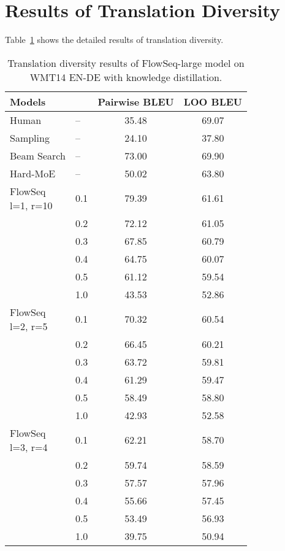 \documentclass[11pt,a4paper]{article}
\begin{document}
\section{Results of Translation Diversity}\label{appendix:deversity}
Table~\ref{tab:diverse} shows the detailed results of translation diversity.

\begin{table}[h]
\centering
\resizebox{0.5\columnwidth}{!}
{
\begin{tabular}{llcc}
\toprule
\textbf{Models} &  & \textbf{Pairwise BLEU} & \textbf{LOO BLEU} \\
\midrule
Human & -- & 35.48 & 69.07 \\
Sampling & -- & 24.10 & 37.80 \\
Beam Search & -- & 73.00 & 69.90\\
Hard-MoE & -- & 50.02 & 63.80 \\
\midrule
\multirowcell{6}{FlowSeq \\ l=1, r=10} 
& 0.1 & 79.39 & 61.61 \\
& 0.2 & 72.12 & 61.05 \\
& 0.3 & 67.85 & 60.79 \\
& 0.4 & 64.75 & 60.07 \\
& 0.5 & 61.12 & 59.54  \\
& 1.0 & 43.53 & 52.86 \\
\midrule
\multirowcell{6}{FlowSeq \\ l=2, r=5}
& 0.1 & 70.32 & 60.54 \\
& 0.2 & 66.45 & 60.21 \\
& 0.3 & 63.72 & 59.81 \\
& 0.4 & 61.29 & 59.47 \\
& 0.5 & 58.49 & 58.80 \\
& 1.0 & 42.93 & 52.58 \\
\midrule
\multirowcell{6}{FlowSeq \\ l=3, r=4} 
& 0.1 & 62.21 & 58.70 \\
& 0.2 & 59.74 & 58.59\\
& 0.3 & 57.57 & 57.96 \\
& 0.4 & 55.66 & 57.45 \\
& 0.5 & 53.49 & 56.93 \\
& 1.0 & 39.75 & 50.94 \\
\bottomrule
\end{tabular}
}
\caption{Translation diversity results of FlowSeq-large model on WMT14 EN-DE with knowledge distillation.}
\label{tab:diverse}
\vspace{-4mm}
\end{table}
\end{document}
